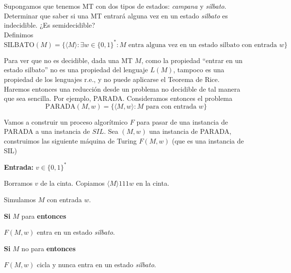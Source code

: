 
\begin{ejercicio}
    Supongamos que tenemos MT con dos tipos de estados: \textit{campana} y \textit{silbato}. 
    Determinar que saber si una MT entrará alguna vez en un estado \textit{silbato} es indecidible. ¿Es semidecidible? \\

    Definimos $$\text{SILBATO}(M) = \{\langle M \rangle : \exists w \in \{0,1\}^{*} : M \text{ entra alguna vez en un estado silbato con entrada } w\}$$

    Para ver que no es decidible, dada una MT $M$, como la propiedad ``entrar en un estado silbato'' 
    no es una propiedad del lenguaje $L(M)$, tampoco es una propiedad de los lenguajes r.e., y no puede aplicarse el 
    Teorema de Rice. \\

    Haremos entonces una reducción desde un problema no decidible de tal manera que sea sencilla. Por ejemplo, PARADA.
    Consideramos entonces el problema $$\text{PARADA}(M,w) = \{\langle M, w \rangle : M \text{ para con entrada } w\}$$

    Vamos a construir un proceso algorítmico $F$ para pasar de una instancia de PARADA a una instancia de 
    $SIL$. Sea $(M, w)$ una instancia de PARADA, construimos las siguiente máquina de Turing $F(M, w)$ 
    (que es una instancia de SIL)

    \begin{algorithm}
        \caption{MT $F(M,w)$}
        \label{algorithm:sil-indecidible}
        \begin{algorithmic}
            \State \textbf{Entrada:} $v \in \{0,1\}^{*}$

            \State Borramos $v$ de la cinta.
            \State Copiamos $\langle M \rangle 111w$ en la cinta.

            \State Simulamos $M$ con entrada $w$. 

            \State \hspace{1cm} \textbf{Si} $M$ para \textbf{entonces}

            \State \hspace{2cm} $F(M,w)$ entra en un estado \textit{silbato}.

            \State \hspace{1cm} \textbf{Si} $M$ no para \textbf{entonces}

            \State \hspace{2cm} $F(M,w)$ cicla y nunca entra en un estado \textit{silbato}.
        \end{algorithmic}
    \end{algorithm}


\end{ejercicio}
